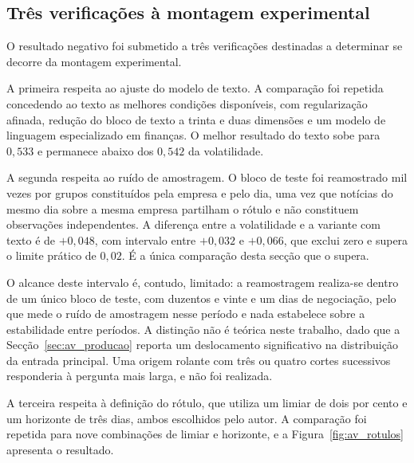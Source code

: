 \subsection{Três verificações à montagem experimental}

O resultado negativo foi submetido a três verificações destinadas a determinar se decorre da montagem
experimental.

A primeira respeita ao ajuste do modelo de texto. A comparação foi repetida concedendo ao texto as
melhores condições disponíveis, com regularização afinada, redução do bloco de texto a trinta e duas
dimensões e um modelo de linguagem especializado em finanças. O melhor resultado do texto sobe para
$0{,}533$ e permanece abaixo dos $0{,}542$ da volatilidade.

A segunda respeita ao ruído de amostragem. O bloco de teste foi reamostrado mil vezes por grupos
constituídos pela empresa e pelo dia, uma vez que notícias do mesmo dia sobre a mesma empresa
partilham o rótulo e não constituem observações independentes. A diferença entre a volatilidade e a
variante com texto é de $+0{,}048$, com intervalo entre $+0{,}032$ e $+0{,}066$, que exclui zero e
supera o limite prático de $0{,}02$. É a única comparação desta secção que o supera.

O alcance deste
intervalo é, contudo, limitado: a reamostragem realiza-se dentro de
um único bloco de teste, com duzentos e vinte e um dias de negociação, pelo que mede o ruído de
amostragem nesse período e nada estabelece sobre a estabilidade entre períodos. A distinção não é
teórica neste trabalho, dado que a Secção~\ref{sec:av_producao} reporta um deslocamento significativo
na distribuição da entrada principal. Uma origem rolante com três ou quatro cortes sucessivos
responderia à pergunta mais larga, e não foi realizada.

A terceira respeita à definição do rótulo, que utiliza um limiar de dois por cento e um horizonte de
três dias, ambos escolhidos pelo autor. A comparação foi repetida para nove combinações de limiar e
horizonte, e a Figura~\ref{fig:av_rotulos} apresenta o resultado.

